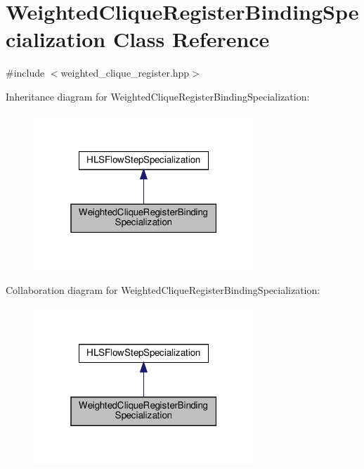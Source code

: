 \hypertarget{classWeightedCliqueRegisterBindingSpecialization}{}\section{Weighted\+Clique\+Register\+Binding\+Specialization Class Reference}
\label{classWeightedCliqueRegisterBindingSpecialization}


{\ttfamily \#include $<$weighted\+\_\+clique\+\_\+register.\+hpp$>$}



Inheritance diagram for Weighted\+Clique\+Register\+Binding\+Specialization\+:
\nopagebreak
\begin{figure}[H]
\begin{center}
\leavevmode
\includegraphics[width=235pt]{d7/df8/classWeightedCliqueRegisterBindingSpecialization__inherit__graph}
\end{center}
\end{figure}


Collaboration diagram for Weighted\+Clique\+Register\+Binding\+Specialization\+:
\nopagebreak
\begin{figure}[H]
\begin{center}
\leavevmode
\includegraphics[width=235pt]{d8/d7f/classWeightedCliqueRegisterBindingSpecialization__coll__graph}
\end{center}
\end{figure}
